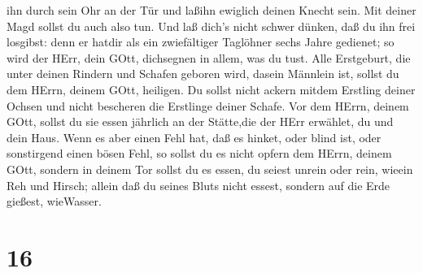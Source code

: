 ihn durch sein Ohr an der Tür und laßihn ewiglich deinen Knecht sein.
Mit deiner Magd sollst du auch also tun.  Und laß dich's
nicht schwer dünken, daß du ihn frei losgibst: denn er hatdir als ein
zwiefältiger Taglöhner sechs Jahre gedienet; so wird der HErr, dein
GOtt, dichsegnen in allem, was du tust.  Alle Erstgeburt,
die unter deinen Rindern und Schafen geboren wird, dasein Männlein ist,
sollst du dem HErrn, deinem GOtt, heiligen. Du sollst nicht ackern
mitdem Erstling deiner Ochsen und nicht bescheren die Erstlinge deiner
Schafe.  Vor dem HErrn, deinem GOtt, sollst du sie essen
jährlich an der Stätte,die der HErr erwählet, du und dein Haus.
 Wenn es aber einen Fehl hat, daß es hinket, oder blind
ist, oder sonstirgend einen bösen Fehl, so sollst du es nicht opfern dem
HErrn, deinem GOtt,  sondern in deinem Tor sollst du es
essen, du seiest unrein oder rein, wieein Reh und Hirsch; 
allein daß du seines Bluts nicht essest, sondern auf die Erde gießest,
wieWasser.

\hypertarget{section-15}{%
\section{16}\label{section-15}}

